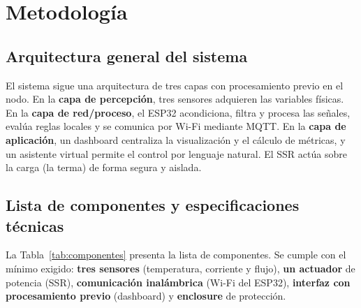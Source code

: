 \documentclass[11pt,a4paper]{article}
\begin{document}
\section{Metodología}
\label{sec:metodologia}

\subsection{Arquitectura general del sistema}
El sistema sigue una arquitectura de tres capas con procesamiento previo en el nodo. En la \textbf{capa de percepción}, tres sensores adquieren las variables físicas. En la \textbf{capa de red/proceso}, el ESP32 acondiciona, filtra y procesa las señales, evalúa reglas locales y se comunica por Wi-Fi mediante MQTT. En la \textbf{capa de aplicación}, un dashboard centraliza la visualización y el cálculo de métricas, y un asistente virtual permite el control por lenguaje natural. El SSR actúa sobre la carga (la terma) de forma segura y aislada.

\subsection{Lista de componentes y especificaciones técnicas}
La Tabla~\ref{tab:componentes} presenta la lista de componentes. Se cumple con el mínimo exigido: \textbf{tres sensores} (temperatura, corriente y flujo), \textbf{un actuador} de potencia (SSR), \textbf{comunicación inalámbrica} (Wi-Fi del ESP32), \textbf{interfaz con procesamiento previo} (dashboard) y \textbf{enclosure} de protección.
\end{document}

